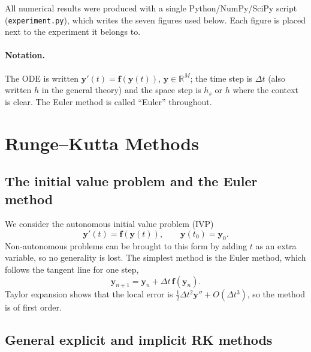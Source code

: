 \documentclass[11pt,a4paper]{article}
\newcommand{\R}{\mathbb{R}}
\newcommand{\Dt}{\Delta t}
\newcommand{\bfy}{\mathbf{y}}
\newcommand{\bff}{\mathbf{f}}
\begin{document}
All numerical results were produced with a single Python/NumPy/SciPy script (\texttt{experiment.py}),
which writes the seven figures used below. Each figure is placed next to the experiment it belongs to.

\paragraph{Notation.} The ODE is written $\bfy'(t)=\bff(\bfy(t))$, $\bfy\in\R^M$; the time step is
$\Dt$ (also written $h$ in the general theory) and the space step is $h_s$ or $h$ where the context is
clear. The Euler method is called ``Euler'' throughout.

\section{Runge--Kutta Methods}\label{sec:rk}

\subsection{The initial value problem and the Euler method}

We consider the autonomous initial value problem (IVP)
\begin{equation}
\bfy'(t)=\bff(\bfy(t)),\qquad \bfy(t_0)=\bfy_0 .
\label{eq:ivp}
\end{equation}
Non-autonomous problems can be brought to this form by adding $t$ as an extra variable, so no
generality is lost. The simplest method is the Euler method, which follows the tangent line for one step,
\begin{equation}
\bfy_{n+1}=\bfy_n+\Dt\,\bff(\bfy_n).
\end{equation}
Taylor expansion shows that the local error is $\tfrac12\Dt^2\bfy''+O(\Dt^3)$, so the method is of
first order.

\subsection{General explicit and implicit RK methods}
\end{document}
